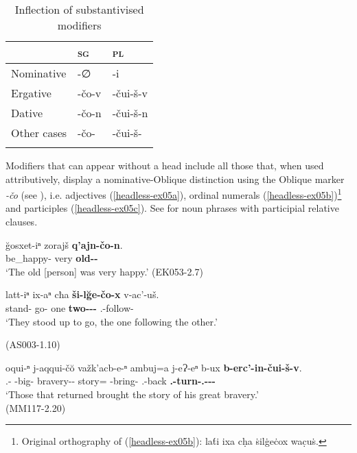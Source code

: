 \begin{table}
	\begin{tabular}{lll}
		\lsptoprule
		& \textsc{sg} & \textsc{pl}\\\midrule
		Nominative & -∅ & -i  \\
		Ergative & -čo-v & -čui-š-v  \\
		Dative & -čo-n & -čui-š-n \\
		Other cases & -čo- & -čui-š- \\
		\lspbottomrule
	\end{tabular}
	\caption{Inflection of substantivised modifiers}
	\label{tableheadless}
\end{table}



Modifiers that can appear without a head include all those that, when used attributively, display a nominative-Oblique distinction using the Oblique marker \textit{-čo} (see ), i.e. adjectives (\ref{headless-ex05a}), ordinal numerals (\ref{headless-ex05b})\footnote{Original orthography of (\ref{headless-ex05b}): la\'{t}i ixa cḥa \.{s}il\.{g}e\.{c}ox wac̣u\.{s}.} and participles (\ref{headless-ex05c}). See  for noun phrases with participial relative clauses.

\begin{exe}
	\ex\label{headless-ex05}
	\begin{xlist}
		
		\ex\label{headless-ex05a}
		\gll \u{g}osxet-iⁿ zorajš \textbf{q'ajn-čo-n}. \\
		be\_happy-{\Aor} very \textbf{old-{\Obl}-{\Dat}} \\
		\trans `The old [person] was very happy.'
		\hfill (EK053-2.7)
		
		\ex\label{headless-ex05b}
		\gll latt-iⁿ ix-aⁿ cħa \textbf{ši-l\u{g}e-čo-x} v-ac'-uš. \\
		stand-{\Aor} go-{\Inf} one \textbf{two-{\Ord}-{\Obl}-{\Cont}} {\M}.{\Sg}-follow-{\Simul} \\
		\trans `They stood up to go, the one following the other.'

		\hfill (AS003-1.10)
		
		\ex\label{headless-ex05c}
		\gll oqui-ⁿ j-aqqui-č\u{o} važk'acb-e-ⁿ ambuj=a j-eɁ-eⁿ b-ux \textbf{b-erc'-in-čui-š-v}. \\
		{\Dist}.{\Obl}-{\Gen} {\J}-big-{\Obl} bravery-{\Obl}-{\Gen} story={\Add} {\J}-bring-{\Aor} {\M}.{\Pl}-back \textbf{{\M}.{\Pl}-turn-{\Ptcp}.{\Aor}-{\Obl}-{\Pl}-{\Erg}} \\
		\trans `Those that returned brought the story of his great bravery.' \\
		\hfill  (MM117-2.20)   
		
	\end{xlist}
\end{exe}

